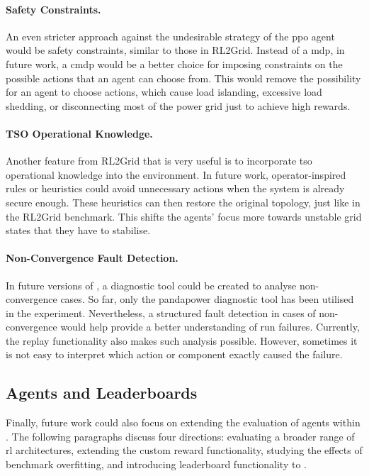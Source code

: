\paragraph{Safety Constraints.}
An even stricter approach against the undesirable strategy of the \ac{ppo} agent would be safety constraints, similar to those in RL2Grid. Instead of a \ac{mdp}, in future work, a \ac{cmdp} would be a better choice for imposing constraints on the possible actions that an agent can choose from. This would remove the possibility for an agent to choose actions, which cause load islanding, excessive load shedding, or disconnecting most of the power grid just to achieve high rewards.

\paragraph{TSO Operational Knowledge.}
Another feature from RL2Grid that is very useful is to incorporate \ac{tso} operational knowledge into the environment. In future work, operator-inspired rules or heuristics could avoid unnecessary actions when the system is already secure enough. These heuristics can then restore the original topology, just like in the RL2Grid benchmark. This shifts the agents' focus more towards unstable grid states that they have to stabilise. 

\paragraph{Non-Convergence Fault Detection.}
In future versions of \benchmark, a diagnostic tool could be created to analyse non-convergence cases. So far, only the pandapower diagnostic tool has been utilised in the experiment. Nevertheless, a structured fault detection in cases of non-convergence would help provide a better understanding of run failures. Currently, the replay functionality also makes such analysis possible. However, sometimes it is not easy to interpret which action or component exactly caused the failure.


\subsection{Agents and Leaderboards}\label{ssec:future-agents}
Finally, future work could also focus on extending the evaluation of agents within \benchmark. The following paragraphs discuss four directions: evaluating a broader range of \ac{rl} architectures, extending the custom reward functionality, studying the effects of benchmark overfitting, and introducing leaderboard functionality to \benchmark.

